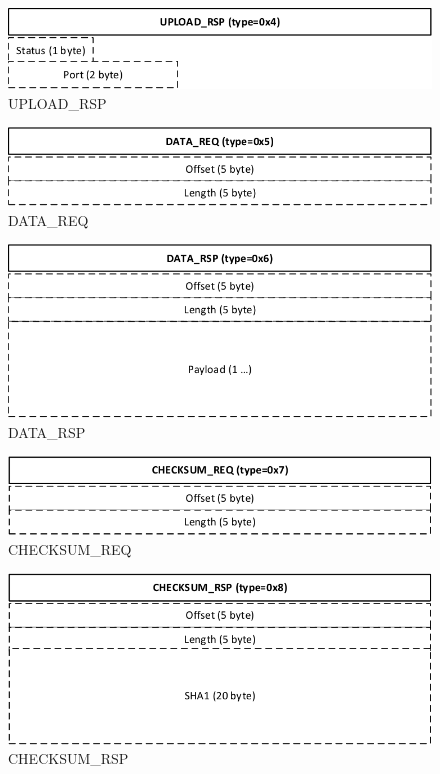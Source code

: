 \documentclass[]{article}
\begin{document}
\begin{figure}[H]
\centering
\includegraphics[width=\textwidth]{frames/upload-rsp.pdf}
\caption{UPLOAD\_RSP}
\label{UPLOAD-RSP}
\end{figure}

\begin{figure}[H]
\centering
\includegraphics[width=\textwidth]{frames/data-req.pdf}
\caption{DATA\_REQ}
\label{DATA-REQ}
\end{figure}

\begin{figure}[H]
\centering
\includegraphics[width=\textwidth]{frames/data-rsp.pdf}
\caption{DATA\_RSP}
\label{DATA-RSP}
\end{figure}

\begin{figure}[H]
\centering
\includegraphics[width=\textwidth]{frames/checksum-req.pdf}
\caption{CHECKSUM\_REQ}
\label{CHECKSUM-REQ}
\end{figure}

\begin{figure}[H]
\centering
\includegraphics[width=\textwidth]{frames/checksum-rsp.pdf}
\caption{CHECKSUM\_RSP}
\label{CHECKSUM-RSP}
\end{figure}
\end{document}
